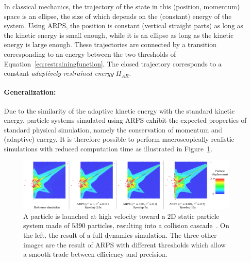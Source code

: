 In classical mechanics, the trajectory of the state in this (position, momentum) space is an ellipse, the size of which depends on the (constant) energy of the system.
Using ARPS, the position is constant (vertical straight parts) as long as the kinetic energy is small enough, while it is an ellipse as long as the kinetic energy is large enough.
These trajectories are connected by a transition corresponding to an energy between the two thresholds of Equation~\eqref{eq:restrainingfunction}.
The closed trajectory corresponds to a constant \textit{adaptively restrained energy} $H_{AR}$.

\paragraph*{Generalization:}
Due to the similarity of the adaptive kinetic energy with the standard kinetic energy, particle systems simulated using ARPS exhibit the expected properties of standard physical simulation, namely the conservation of momentum and (adaptive) energy. It is therefore possible to perform macroscopically realistic simulations with reduced computation time as illustrated in Figure~\ref{fig:cascadeCollision}.

\begin{figure}[h!]
	\centering
	\includegraphics[width=1.0\linewidth]{images/arps-vriphys2013/ARPS_Collision_Artemova.png}
	\caption[ARPS: Collision Cascade from~\cite{Artemova2012}]{\label{fig:cascadeCollision} 
		A particle is launched at high velocity toward a 2D static particle system made of $5390$ particles, resulting into a collision cascade~\cite{Artemova2012}. 
		On the left, the result of a full dynamics simulation. 
		The three other images are the result of ARPS with different thresholds which allow a smooth trade between efficiency and precision.}
\end{figure}

